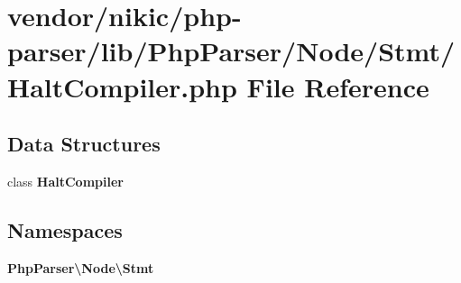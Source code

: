 \section{vendor/nikic/php-\/parser/lib/\+Php\+Parser/\+Node/\+Stmt/\+Halt\+Compiler.php File Reference}
\label{_halt_compiler_8php}
\subsection*{Data Structures}
\begin{DoxyCompactItemize}
\item 
class {\bf Halt\+Compiler}
\end{DoxyCompactItemize}
\subsection*{Namespaces}
\begin{DoxyCompactItemize}
\item 
 {\bf Php\+Parser\textbackslash{}\+Node\textbackslash{}\+Stmt}
\end{DoxyCompactItemize}
